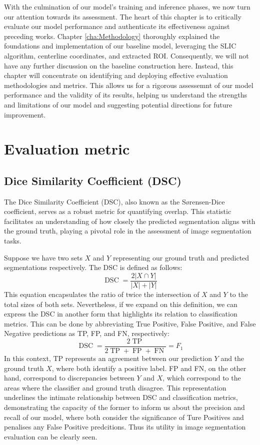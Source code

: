 With the culmination of our model's training and inference phases, we now turn our attention towards its assessment. The heart of this chapter is to critically evaluate our model performance and authenticate its effectiveness against preceding works. Chapter \ref{cha:Methodology} thoroughly explained the foundations and implementation of our baseline model, leveraging the SLIC algorithm, centerline coordinates, and extracted ROI. Consequently, we will not have any further discussion on the baseline construction here. Instead, this chapter will concentrate on identifying and deploying effective evaluation methodologies and metrics. This allows us for a rigorous assessemnt of our model performance and the validity of its results, helping us understand the strengths and limitations of our model and suggesting potential directions for future improvement.

\section{Evaluation metric}
\subsection{Dice Similarity Coefficient (DSC)}

The Dice Similarity Coefficient (DSC), also known as the Sørensen-Dice coefficient, serves as a robust metric for quantifying overlap. This statistic facilitates an understanding of how closely the predicted segmentation aligns with the ground truth, playing a pivotal role in the assessment of image segmentation tasks.

Suppose we have two sets \(X\) and \(Y\) representing our ground truth and predicted segmentations respectively. The DSC is defined as follows:
\[
\operatorname*{DSC} = \frac{2|X \cap Y|}{|X| + |Y|}
\]
This equation encapsulates the ratio of twice the intersection of \(X\) and \(Y\) to the total sizes of both sets. Nevertheless, if we expand on this definition, we can express the DSC in another form that highlights its relation to classification metrics. This can be done by abbreviating True Positive, False Positive, and False Negative predictions as TP, FP, and FN, respectively:
\[
\operatorname*{DSC} = \frac{2 \operatorname*{TP}}{2 \operatorname*{TP} + \operatorname*{FP} + \operatorname*{FN}} = F_{1}
\]
In this context, TP represents an agreement between our prediction \(Y\) and the ground truth \(X\), where both identify a positive label. FP and FN, on the other hand, correspond to discrepancies between \(Y\) and \(X\), which correspond to the areas where the classifier and ground truth disagree. This representation underlines the intimate relationship between DSC and classification metrics, demonstrating the capacity of the former to inform us about the precision and recall of our model, where both consider the significance of Ture Positives and penalises any False Positive predcitions. Thus its utility in image segmentation evaluation can be clearly seen.

